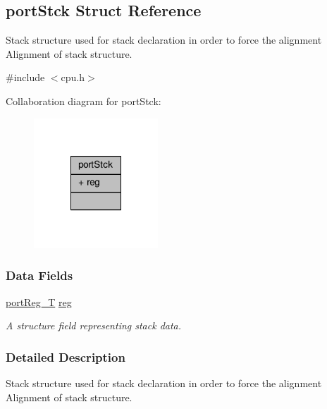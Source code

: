 \hypertarget{structportStck}{\subsection{port\-Stck Struct Reference}
\label{structportStck}
}


Stack structure used for stack declaration in order to force the alignment Alignment of stack structure.  




{\ttfamily \#include $<$cpu.\-h$>$}



Collaboration diagram for port\-Stck\-:\nopagebreak
\begin{figure}[H]
\begin{center}
\leavevmode
\includegraphics[width=132pt]{structportStck__coll__graph}
\end{center}
\end{figure}
\subsubsection*{Data Fields}
\begin{DoxyCompactItemize}
\item 
\hyperlink{group__template__cpu__intf_ga99980ab56ce9857e7380210d12e3d41f}{port\-Reg\-\_\-\-T} \hyperlink{structportStck_a52e715773895c635b3e8ddb30d582d9c}{reg}
\begin{DoxyCompactList}\small\item\em A structure field representing stack data. \end{DoxyCompactList}\end{DoxyCompactItemize}


\subsubsection{Detailed Description}
Stack structure used for stack declaration in order to force the alignment Alignment of stack structure. 

